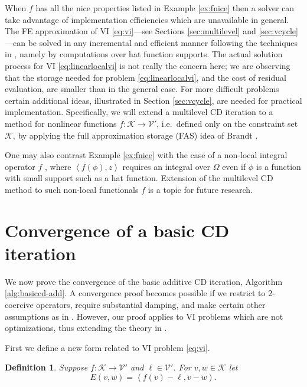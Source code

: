 \documentclass[letterpaper,final,12pt,reqno]{amsart}
\theoremstyle{cstyle}
\theoremstyle{cstyle*}
\theoremstyle{dstyle}
\newtheorem{definition}[theorem]{Definition}
\numberwithin{equation}{section}
\numberwithin{figure}{section}
\numberwithin{table}{section}
\numberwithin{theorem}{section}
\newcommand{\cK}{\mathcal{K}}
\newcommand{\cV}{\mathcal{V}}
\newcommand{\ip}[2]{\left<#1,#2\right>}
\begin{document}
When $f$ has all the nice properties listed in Example \ref{ex:fnice} then a solver can take advantage of implementation efficiencies which are unavailable in general.  The FE approximation of VI \eqref{eq:vi}---see Sections \ref{sec:multilevel} and \ref{sec:vcycle}---can be solved in any incremental and efficient manner following the techniques in \cite{GraeserKornhuber2009,Tai2003}, namely by computations over hat function supports.  The actual solution process for VI \eqref{eq:linearlocalvi} is not really the concern here; we are observing that the storage needed for problem \eqref{eq:linearlocalvi}, and the cost of residual evaluation, are smaller than in the general case.  For more difficult problems certain additional ideas, illustrated in Section \ref{sec:vcycle}, are needed for practical implementation.  Specifically, we will extend a multilevel CD iteration to a method for nonlinear functions $f:\cK\to\cV'$, i.e.~defined only on the constraint set $\cK$, by applying the full approximation storage (FAS) idea of Brandt \cite{Brandt1977}.

One may also contrast Example \ref{ex:fnice} with the case of a non-local integral operator $f$ \cite{Bueler2021conservation}, where $\ip{f(\phi)}{z}$ requires an integral over $\Omega$ even if $\phi$ is a function with small support such as a hat function.  Extension of the multilevel CD method to such non-local functionals $f$ is a topic for future research.


\section{Convergence of a basic CD iteration} \label{sec:convergence}

We now prove the convergence of the basic additive CD iteration, Algorithm \ref{alg:basiccd-add}. %
A convergence proof becomes possible if we restrict to $2$-coercive operators, require substantial damping, and make certain other assumptions as in \cite{Tai2003}.  However, our proof applies to VI problems which are not optimizations, thus extending the theory in \cite{Tai2003}.

First we define a new form related to VI problem \eqref{eq:vi}.

\begin{definition} Suppose $f:\cK \to \cV'$ and $\ell \in \cV'$.  For $v,w \in \cK$ let
\begin{equation}
  E(v,w) = \ip{f(v)-\ell}{v-w}.  \label{eq:normlikedefn}
\end{equation}
\end{definition}
\end{document}

